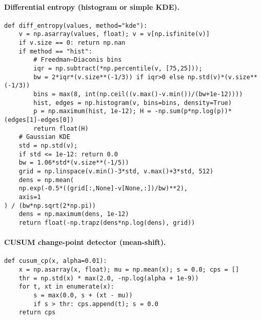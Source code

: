 \documentclass{article}
\theoremstyle{definition}
\begin{document}
\paragraph{Differential entropy (histogram or simple KDE).}
\begin{verbatim}
def diff_entropy(values, method="kde"):
    v = np.asarray(values, float); v = v[np.isfinite(v)]
    if v.size == 0: return np.nan
    if method == "hist":
        # Freedman–Diaconis bins
        iqr = np.subtract(*np.percentile(v, [75,25])); 
        bw = 2*iqr*(v.size**(-1/3)) if iqr>0 else np.std(v)*(v.size**(-1/3))
        bins = max(8, int(np.ceil((v.max()-v.min())/(bw+1e-12))))
        hist, edges = np.histogram(v, bins=bins, density=True)
        p = np.maximum(hist, 1e-12); H = -np.sum(p*np.log(p))*(edges[1]-edges[0])
        return float(H)
    # Gaussian KDE
    std = np.std(v); 
    if std <= 1e-12: return 0.0
    bw = 1.06*std*(v.size**(-1/5))
    grid = np.linspace(v.min()-3*std, v.max()+3*std, 512)
    dens = np.mean(
    np.exp(-0.5*((grid[:,None]-v[None,:])/bw)**2),
    axis=1
) / (bw*np.sqrt(2*np.pi))
    dens = np.maximum(dens, 1e-12)
    return float(-np.trapz(dens*np.log(dens), grid))
\end{verbatim}

\paragraph{CUSUM change-point detector (mean-shift).}
\begin{verbatim}
def cusum_cp(x, alpha=0.01):
    x = np.asarray(x, float); mu = np.mean(x); s = 0.0; cps = []
    thr = np.std(x) * max(2.0, -np.log(alpha + 1e-9))
    for t, xt in enumerate(x):
        s = max(0.0, s + (xt - mu))
        if s > thr: cps.append(t); s = 0.0
    return cps
\end{verbatim}
\end{document}
